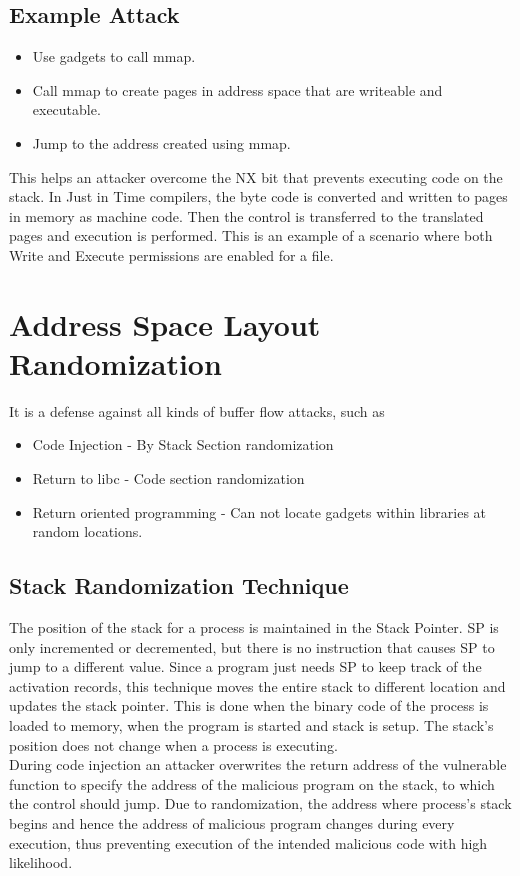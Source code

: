 \documentclass[11pt]{article} %
\begin{document}
\subsection{Example Attack}
\begin {itemize} \itemsep -2pt
\item Use gadgets to call  mmap.
\item Call mmap to create pages in address space that are writeable and executable.
\item Jump to the address created using mmap.
\end {itemize}

This helps an attacker overcome the NX bit that prevents executing code on the
stack. In Just in Time compilers, the byte code is converted and written to
pages in memory as machine code. Then the control is transferred to the
translated pages and execution is performed. This is an example of a scenario
where both Write and Execute permissions are enabled for a file.

\section {Address Space Layout Randomization}
It is a defense  against all kinds of buffer flow attacks, such as
\begin {itemize} \itemsep -2pt
\item Code Injection - By Stack Section randomization
\item Return to libc - Code section randomization
\item Return oriented programming - Can not locate gadgets within libraries at random locations.
\end {itemize}
\subsection {Stack Randomization Technique}
The position of the stack for a process is maintained in the Stack Pointer. SP
is only incremented or decremented, but there is no instruction that causes SP
to jump to a different value. Since a program just needs SP to keep track of
the activation records, this technique moves the entire stack to different
location and updates the stack pointer. This is done when the binary code of
the process is loaded to memory, when the program is started and stack is setup.
The stack's position does not change when a process is executing.\\

During code injection an attacker overwrites the return address of the vulnerable
function to specify the address of the malicious program on the stack, to which
the control should jump. Due to randomization, the address where process's stack
begins and hence the address of malicious program changes during every execution,
thus preventing execution of the intended malicious code with high likelihood.\\
\end{document}
